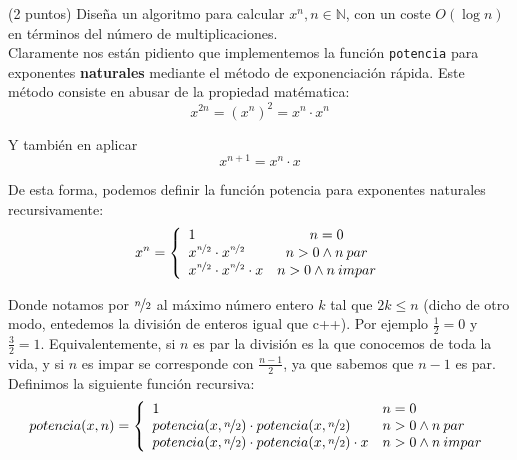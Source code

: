 \documentclass[12pt]{article}
\begin{document}
    \begin{ejercicio}
        (2 puntos) Diseña 
        un algoritmo para calcular 
        $x^{n},   n \in \mathbb{N}$, 
        con un coste $O(\log{n})$ en términos del
        número de multiplicaciones.\\

        Claramente nos están pidiento que implementemos la función 
        \verb|potencia| para exponentes \textbf{naturales} 
        mediante el método de exponenciación rápida. Este método 
        consiste en abusar de la propiedad matématica:
        \begin{equation*}
            x^{2n} = (x^{n})^{2} = x^{n} \cdot x^{n}
        \end{equation*}

        Y también en aplicar 
        \begin{equation*}
            x^{n+1} = x^{n} \cdot x
        \end{equation*}

        De esta forma, podemos definir la función potencia para 
        exponentes naturales recursivamente:
        \begin{equation*}
            x^{n} = \left \{ \begin{array}{lcc} 
                1 & n = 0  \\ 
                x^{\nicefrac{n}{2}} \cdot x^{\nicefrac{n}{2}}  & n > 0 \wedge n\: par \\
                x^{\nicefrac{n}{2}} \cdot x^{\nicefrac{n}{2}} \cdot x  & n > 0 \wedge n\: impar
            \end{array} \right .
        \end{equation*}

        Donde notamos por $\nicefrac{n}{2}$ al máximo número entero $k$
        tal que $2k \leq n$ (dicho de otro modo, entedemos la división 
        de enteros igual que c++). Por ejemplo $\frac{1}{2} = 0$
        y $\frac{3}{2} = 1$. Equivalentemente, si $n$ es par 
        la división es la que conocemos de toda la vida, y si 
        $n$ es impar se corresponde con $\frac{n-1}{2}$, ya que sabemos
        que $n-1$ es par.\\
        Definimos la siguiente función recursiva:
        \begin{equation*}
            potencia(x,n) = \left \{ \begin{array}{ll} 
                1 & n = 0  \\ 
                potencia(x,\nicefrac{n}{2}) \cdot potencia(x,\nicefrac{n}{2})  & n > 0 \wedge n\: par \\
                potencia(x,\nicefrac{n}{2}) \cdot potencia(x,\nicefrac{n}{2}) \cdot x  & n > 0 \wedge n\: impar
            \end{array} \right .
        \end{equation*}


\end{ejercicio}
\end{document}
